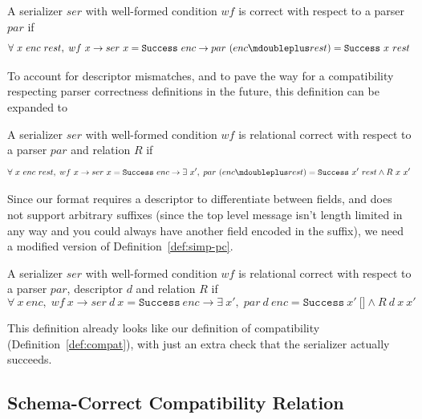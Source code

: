 \vspace{1em}
\begin{definition}\label{def:base-pc}
  A serializer $ser$ with well-formed condition $wf$ is correct with respect to
  a parser $par$ if
  \[\forall\ x\ enc\ rest,\;wf\ x \rightarrow ser\ x = \mathtt{Success}\ enc \rightarrow par\ (enc \mdoubleplus rest) =
    \mathtt{Success}\ x\ rest \]
\end{definition}

To account for descriptor mismatches, and to pave the way for a compatibility
respecting parser correctness definitions in the future, this definition can be
expanded to

\vspace{1em}
\begin{definition}\label{def:simp-pc}
  A serializer $ser$ with well-formed condition $wf$ is relational correct with
  respect to a parser $par$ and relation $R$ if
  \[ \forall\ x\ enc\ rest,\;wf\ x \to ser\ x = \mathtt{Success}\ enc \rightarrow \exists\ x',\;par\ (enc
    \mdoubleplus rest) = \mathtt{Success}\ x'\ rest \wedge R\ x\ x' \]
\end{definition}

Since our format requires a descriptor to differentiate between fields, and does
not support arbitrary suffixes (since the top level message isn't length limited
in any way and you could always have another field encoded in the suffix), we
need a modified version of Definition~\ref{def:simp-pc}.

\vspace{1em}
\begin{definition}
  A serializer $ser$ with well-formed condition $wf$ is relational correct with
  respect to a parser $par$, descriptor $d$ and relation $R$ if
  \[ \forall\ x\ enc,\;wf\ x \to ser\ d\ x = \mathtt{Success}\ enc \rightarrow \exists\ x',\;par\ d\ enc
    = \mathtt{Success}\ x'\ \texttt{[]} \wedge R\ d\ x\ x' \]
\end{definition}\label{def:rpc}

This definition already looks like our definition of compatibility
(Definition~\ref{def:compat}), with just an extra check that the serializer
actually succeeds.

\subsection{Schema-Correct Compatibility Relation}\label{sec:sc-id-compat}

